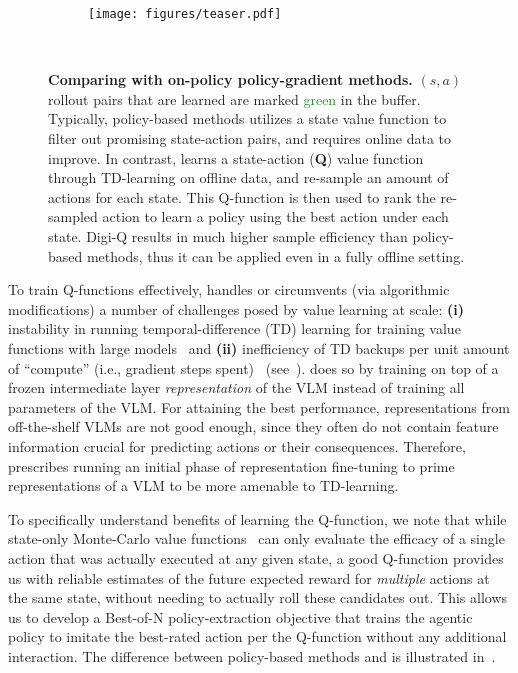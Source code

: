 \begin{figure*}[!t]
     \centering
     \begin{subfigure}[b]{1.00\textwidth}
         \centering
    \texttt{[image: figures/teaser.pdf]}
     \end{subfigure}
     ~ \vspace{-0.2cm}
     \caption{\footnotesize{\textbf{Comparing \ourmethod{} with on-policy policy-gradient methods.} $(s, a)$ rollout pairs that are learned are marked \textcolor{ForestGreen}{green} in the buffer. Typically, policy-based methods utilizes a state value function to filter out promising state-action pairs, and requires online data to improve. In contrast, \ourmethod{} learns a state-action (\textbf{Q}) value function through TD-learning on offline data, and re-sample an amount of actions for each state. This Q-function is then used to rank the re-sampled action to learn a policy using the best action under each state. Digi-Q results in much higher sample efficiency than policy-based methods, thus it can be applied even in a fully offline setting.}}
        \label{fig:teaser} 
\end{figure*}

To train Q-functions effectively, \ourmethod{} handles or circumvents (via algorithmic modifications) a number of challenges posed by value learning at scale: \textbf{(i)} instability in running temporal-difference (TD) learning for training value functions with large models~\citep{kumar2021dr3} and \textbf{(ii)} inefficiency of TD backups per unit amount of ``compute'' (i.e., gradient steps spent)~\citep{chebotar2023qtransformerscalableofflinereinforcement} (see~).
\ourmethod{} does so by training on top of a frozen intermediate layer \emph{representation} of the VLM instead of training all parameters of the VLM. For attaining the best performance, representations from off-the-shelf VLMs are not good enough, since they often do not contain feature information crucial for predicting actions or their consequences. Therefore, \ourmethod{} prescribes running an initial phase of representation fine-tuning to prime representations of a VLM to be more amenable to TD-learning. 

To specifically understand benefits of learning the Q-function, we note that while state-only Monte-Carlo value functions~\citep{bai2024digirltraininginthewilddevicecontrol, zhai2024finetuninglargevisionlanguagemodels} can only evaluate the efficacy of a single action that was actually executed at any given state, a good Q-function provides us with reliable estimates of the future expected reward for \emph{multiple} actions at the same state, without needing to actually roll these candidates out. This allows us to develop a Best-of-N policy-extraction objective that trains the agentic policy to imitate the best-rated action per the Q-function without any additional interaction. The difference between policy-based methods and \ourmethod{} is illustrated in~.

